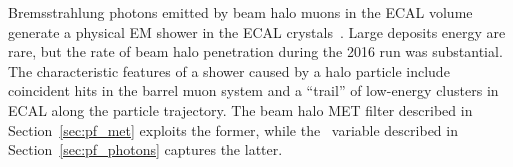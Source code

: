 Bremsstrahlung photons emitted by beam halo muons in the ECAL volume generate a physical EM shower in the ECAL crystals~\cite{Halo2015}. 
Large deposits energy are rare, but the rate of beam halo penetration
during the 2016 run was substantial. 
The characteristic features of a shower caused by a halo particle include coincident hits in the barrel muon system and a ``trail'' of low-energy clusters in ECAL along the particle trajectory. 
The beam halo MET filter described in Section~\ref{sec:pf_met} exploits the former, while the \emip\ variable described in Section~\ref{sec:pf_photons} captures the latter.

